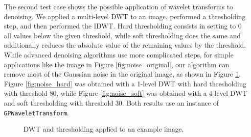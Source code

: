The second test case shows the possible application of wavelet transforms to denoising. We applied a multi-level DWT to an image, performed a thresholding step, and then performed the IDWT. Hard thresholding consists in setting to 0 all values below the given threshold, while soft thresholding does the same and additionally reduces the absolute value of the remaining values by the threshold. While advanced denoising algorithms use more complicated steps, for simple applications like the image in Figure \ref{fig:noise_original}, our algorithm can remove most of the Gaussian noise in the original image, as shown in Figure \ref{fig:wavelet_2d}. Figure \ref{fig:noise_hard} was obtained with a 1-level DWT with hard thresholding with threshold 80, while Figure \ref{fig:noise_soft} was obtained with a 4-level DWT and soft thresholding with threshold 30. Both results use an instance of \texttt{GP\-Wavelet\-Transform}. 

\begin{figure}[h]
    \centering
    \caption{DWT and thresholding applied to an example image.}
    \label{fig:wavelet_2d}
\end{figure}